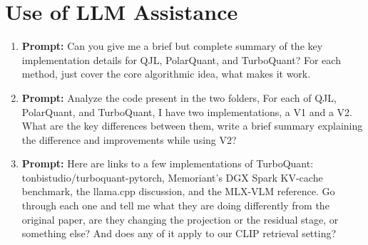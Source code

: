 \documentclass[11pt]{article}
\begin{document}
\appendix

\section{Use of LLM Assistance}
\label{app:llm}


\begin{enumerate}[leftmargin=*, itemsep=1em]
  \item \textbf{Prompt:} Can you give me a brief but complete summary of the key implementation details for QJL, PolarQuant, and TurboQuant? For each method, just cover the core algorithmic idea, what makes it work.

  \item \textbf{Prompt:} Analyze the code present in the two folders, For each of QJL, PolarQuant, and TurboQuant, I have two implementations, a V1 and a V2. What are the key differences between them, write a brief summary explaining the difference and improvements while using V2?

  \item \textbf{Prompt:} Here are links to a few implementations of TurboQuant: tonbistudio/turboquant-pytorch, Memoriant's DGX Spark KV-cache benchmark, the llama.cpp discussion, and the MLX-VLM reference. Go through each one and tell me what they are doing differently from the original paper, are they changing the projection or the residual stage, or something else? And does any of it apply to our CLIP retrieval setting?

\end{enumerate}
\end{document}
